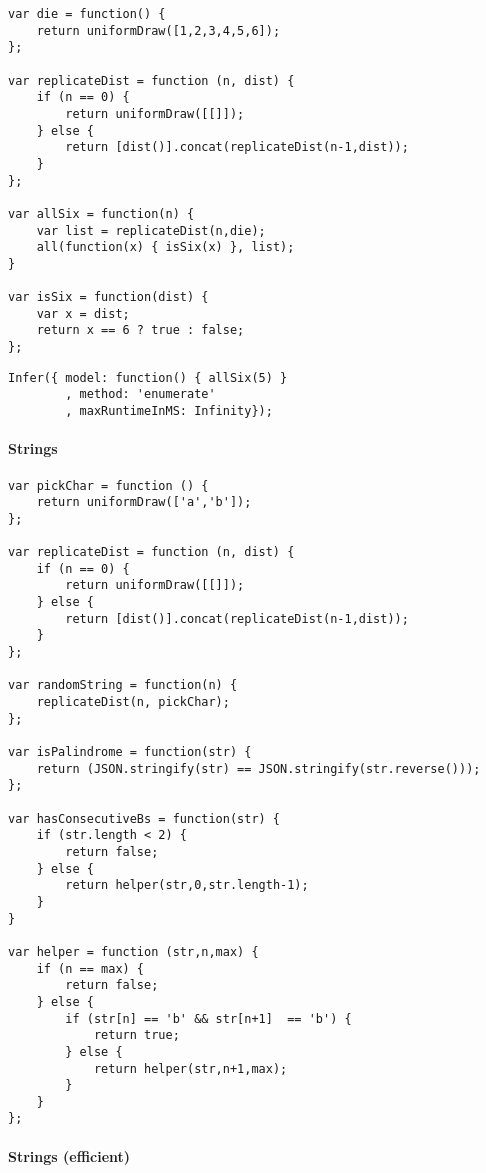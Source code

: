 \begin{verbatim}
var die = function() {
    return uniformDraw([1,2,3,4,5,6]);
};

var replicateDist = function (n, dist) {
    if (n == 0) {
        return uniformDraw([[]]);
    } else {
        return [dist()].concat(replicateDist(n-1,dist));
    }
};

var allSix = function(n) {
    var list = replicateDist(n,die);
    all(function(x) { isSix(x) }, list);
}

var isSix = function(dist) {
    var x = dist;
    return x == 6 ? true : false;
};

\end{verbatim}

\begin{verbatim}
Infer({ model: function() { allSix(5) }
        , method: 'enumerate'
        , maxRuntimeInMS: Infinity});
\end{verbatim}

\paragraph{Strings}

\begin{verbatim}
var pickChar = function () {
    return uniformDraw(['a','b']);
};

var replicateDist = function (n, dist) {
    if (n == 0) {
        return uniformDraw([[]]);
    } else {
        return [dist()].concat(replicateDist(n-1,dist));
    }
};

var randomString = function(n) {
    replicateDist(n, pickChar);
};

var isPalindrome = function(str) {
    return (JSON.stringify(str) == JSON.stringify(str.reverse()));
};

var hasConsecutiveBs = function(str) {
    if (str.length < 2) {
        return false;
    } else {
        return helper(str,0,str.length-1);
    }
}

var helper = function (str,n,max) {
    if (n == max) {
        return false;
    } else {
        if (str[n] == 'b' && str[n+1]  == 'b') {
            return true;
        } else {
            return helper(str,n+1,max);
        }
    }
};
\end{verbatim}

\paragraph{Strings (efficient)}


